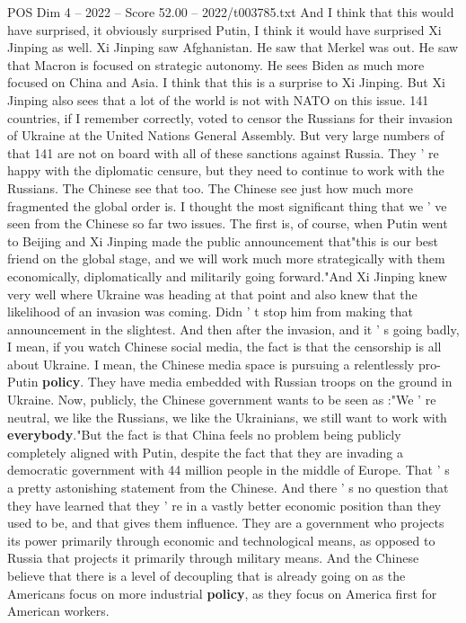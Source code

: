 \begin{textsample}{POS Dim 4 – 2022 – Score 52.00 – 2022/t003785.txt}
And I think that this would have surprised, it obviously surprised Putin, I think it would have surprised Xi Jinping as well.
Xi Jinping saw Afghanistan.
He saw that Merkel was out.
He saw that Macron is focused on strategic autonomy.
He sees Biden as much more focused on China and Asia.
I think that this is a surprise to Xi Jinping.
But Xi Jinping also sees that a lot of the world is not with NATO on this issue. 141 countries, if I remember correctly, voted to censor the Russians for their invasion of Ukraine at the United Nations General Assembly.
But very large numbers of that 141 are not on board with all of these sanctions against Russia.
They ' re happy with the diplomatic censure, but they need to continue to work with the Russians.
The Chinese see that too.
The Chinese see just how much more fragmented the global order is.
I thought the most significant thing that we ' ve seen from the Chinese so far two issues.
The first is, of course, when Putin went to Beijing and Xi Jinping made the public announcement that"this is our best friend on the global stage, and we will work much more strategically with them economically, diplomatically and militarily going forward."And Xi Jinping knew very well where Ukraine was heading at that point and also knew that the likelihood of an invasion was coming.
Didn ' t stop him from making that announcement in the slightest.
And then after the invasion, and it ' s going badly, I mean, if you watch Chinese social media, the fact is that the censorship is all about Ukraine.
I mean, the Chinese media space is pursuing a relentlessly pro-Putin \textbf{policy}.
They have media embedded with Russian troops on the ground in Ukraine.
Now, publicly, the Chinese government wants to be seen as :"We ' re neutral, we like the Russians, we like the Ukrainians, we still want to work with \textbf{everybody}."But the fact is that China feels no problem being publicly completely aligned with Putin, despite the fact that they are invading a democratic government with 44 million people in the middle of Europe.
That ' s a pretty astonishing statement from the Chinese.
And there ' s no question that they have learned that they ' re in a vastly better economic position than they used to be, and that gives them influence.
They are a government who projects its power primarily through economic and technological means, as opposed to Russia that projects it primarily through military means.
And the Chinese believe that there is a level of decoupling that is already going on as the Americans focus on more industrial \textbf{policy}, as they focus on America first for American workers.

\end{textsample}
